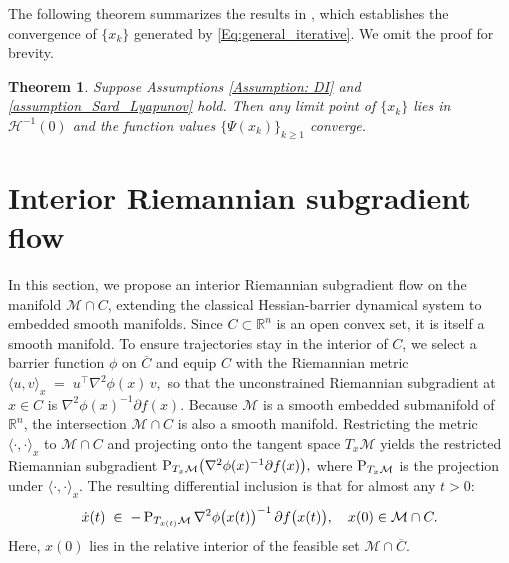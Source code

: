 \documentclass[11pt]{article}
\newcommand{\R}{\mathbb R}
\newcommand{\cM}{\mathcal M}
\newtheorem{theorem}{Theorem}[section]
\begin{document}
The following theorem summarizes the results in \cite{duchi2018stochastic,davis2020stochastic}, which establishes the convergence of $\{x_k\}$ generated by \eqref{Eq:general_iterative}. We omit the proof for brevity.
\begin{theorem}\label{convergence-thm-func-val}
Suppose Assumptions \ref{Assumption: DI} and \ref{assumption_Sard_Lyapunov} hold. Then any limit point of $\{x_k\}$ lies in $\mathcal{H}^{-1}(0)$ and the function values $\{\Psi(x_k)\}_{k\geq1}$ converge.
\end{theorem}



\section{Interior Riemannian  subgradient flow}

In this section, we propose an interior Riemannian subgradient flow on the manifold \(\cM\cap C\), extending the classical Hessian-barrier dynamical system to embedded smooth manifolds.  Since \(C\subset\R^n\) is an open convex set, it is itself a smooth manifold.  To ensure trajectories stay in the interior of \(C\), we select a barrier function \(\phi\) on \(\overline C\) and equip \(C\) with the Riemannian metric $\langle u,v\rangle_x \;=\; u^\top\nabla^2\phi(x)\,v,$ so that the unconstrained Riemannian subgradient at \(x\in C\) is \(\nabla^2\phi(x)^{-1}\partial f(x)\). Because \(\cM\) is a smooth embedded submanifold of \(\R^n\), the intersection \(\cM\cap C\) is also a smooth manifold.  Restricting the metric \(\langle\cdot,\cdot\rangle_x\) to \(\cM\cap C\) and projecting onto the tangent space \(T_x\cM\) yields the restricted Riemannian subgradient ${\rm P}_{T_x\cM}\bigl(\nabla^2\phi(x)^{-1}\partial f(x)\bigr),$ where \({\rm P}_{T_x\cM}\) is the projection under \(\langle\cdot,\cdot\rangle_x\).  The resulting differential inclusion is that for almost any $t>0$:
\begin{equation}
\label{eq:DI_manifold}
\dot x(t)\;\in\;-\,{\rm P}_{T_{x(t)}\cM}\,\nabla^2\phi\bigl(x(t)\bigr)^{-1}\,\partial f\bigl(x(t)\bigr),
\quad x(0)\in \cM\cap C.
\end{equation}
Here, \(x(0)\) lies in the relative interior of the feasible set \(\cM\cap\overline C\). 
\end{document}

